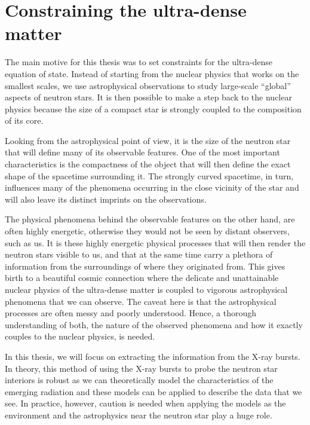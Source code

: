 \chapter{Constraining the ultra-dense matter}

The main motive for this thesis was to set constraints for the ultra-dense equation of state.
Instead of starting from the nuclear physics that works on the smallest scales, we use astrophysical observations to study large-scale ``global'' aspects of neutron stars.
It is then possible to make a step back to the nuclear physics because the size of a compact star is strongly coupled to the composition of its core.

Looking from the astrophysical point of view, it is the size of the neutron star that will define many of its observable features.
One of the most important characteristics is the compactness of the object that will then define the exact shape of the spacetime surrounding it.
The strongly curved spacetime, in turn, influences many of the phenomena occurring in the close vicinity of the star and will also leave its distinct imprints on the observations.

The physical phenomena behind the observable features on the other hand, are often highly energetic, otherwise they would not be seen by distant observers, such as us.
It is these highly energetic physical processes that will then render the neutron stars visible to us, and that at the same time carry a plethora of information from the surroundings of where they originated from.
This gives birth to a beautiful cosmic connection where the delicate and unattainable nuclear physics of the ultra-dense matter is coupled to vigorous astrophysical phenomena that we can observe.
The caveat here is that the astrophysical processes are often messy and poorly understood.
Hence, a thorough understanding of both, the nature of the observed phenomena and how it exactly couples to the nuclear physics, is needed.

In this thesis, we will focus on extracting the information from the X-ray bursts.
In theory, this method of using the X-ray bursts to probe the neutron star interiors is robust as we can theoretically model the characteristics of the emerging radiation and these models can be applied to describe the data that we see. 
In practice, however, caution is needed when applying the models as the environment and the astrophysics near the neutron star play a huge role.


